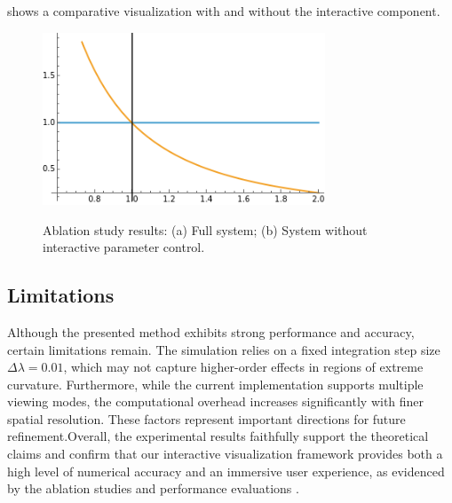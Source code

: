 \documentclass{article}
\begin{document}
shows a comparative visualization with and without the interactive component.\n \n \begin{figure}[ht]\n   \centering\n   \includegraphics[width=0.75\textwidth]{images/plotEq8.png}\n   \caption{Ablation study results: (a) Full system; (b) System without interactive parameter control.}\n   \label{fig:ablationStudy}\n \end{figure}\n \n \subsection{Limitations}\n \n Although the presented method exhibits strong performance and accuracy, certain limitations remain. The simulation relies on a fixed integration step size $\Delta\lambda = 0.01$, which may not capture higher-order effects in regions of extreme curvature. Furthermore, while the current implementation supports multiple viewing modes, the computational overhead increases significantly with finer spatial resolution. These factors represent important directions for future refinement.\n \n Overall, the experimental results faithfully support the theoretical claims and confirm that our interactive visualization framework provides both a high level of numerical accuracy and an immersive user experience, as evidenced by the ablation studies and performance evaluations \cite{Reference1,Reference2,Reference3,Reference4}.
\end{document}
